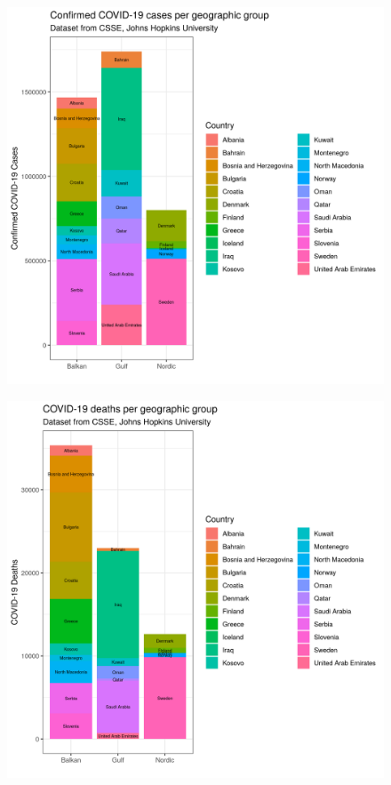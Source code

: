 \begin{figure}[H]
\centering
\begin{minipage}{.5\textwidth}
  \centering
  \includegraphics[width=1\linewidth]{images/aggr_geo_conf.png}
  \label{fig:aggr_geo_conf}
\end{minipage}%
\begin{minipage}{.5\textwidth}
  \centering
  \includegraphics[width=1\linewidth]{images/aggr_geo_deaths.png}
  \label{fig:aggr_geo_deaths}
\end{minipage}
\end{figure}

